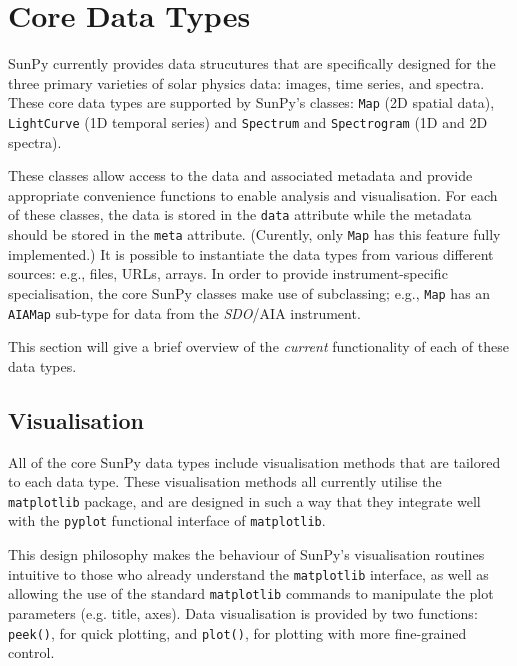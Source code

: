 \section{Core Data Types}\label{sec:DataTypes}

SunPy currently provides data strucutures that are specifically designed for the
three primary varieties of solar physics data: images, time series, and
spectra. These core data types are supported by SunPy's classes:
\texttt{Map} (2D spatial data), \texttt{LightCurve} (1D temporal series)
and \texttt{Spectrum} and \texttt{Spectrogram} (1D and 2D spectra). 

These classes allow access to the data
and associated metadata and provide appropriate convenience functions to
enable analysis and visualisation. For each of these classes, the data is
stored in the \texttt{data} attribute while the metadata should be stored 
in the \texttt{meta} attribute. (Curently, only \texttt{Map} has this feature 
fully implemented.) 
It is possible to instantiate the
data types from various
different sources: e.g., files, URLs, arrays.  
In order to provide instrument-specific specialisation, the core SunPy classes 
make use of subclassing; e.g., \texttt{Map} has an \texttt{AIAMap} 
sub-type for data from the \textit{SDO}/AIA instrument. 

This section will give a brief overview of the \textit{current} functionality 
of each of these data types.

\subsection{Visualisation}
\label{subsec:Viz}
All of the core SunPy data types 
include visualisation methods that are tailored to each data type. 
These visualisation methods all currently utilise the \texttt{matplotlib} 
package, and are designed in such a way that they integrate well with 
the \texttt{pyplot} functional interface of \texttt{matplotlib}.

This design philosophy makes the behaviour of SunPy's visualisation 
routines intuitive to those who already understand the \texttt{matplotlib}
interface, as well as allowing the use of the standard 
\texttt{matplotlib} commands to manipulate the plot parameters (e.g. title, axes).
Data visualisation is provided by two functions: \texttt{peek()}, for quick 
plotting, and \texttt{plot()}, for plotting with more fine-grained control.



